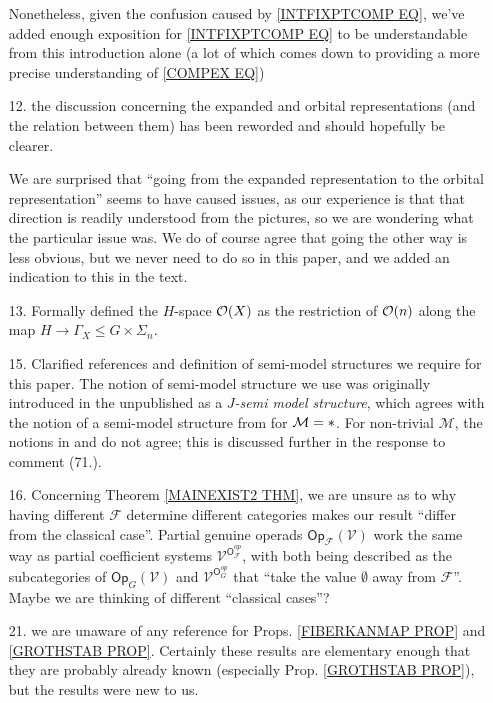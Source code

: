 \documentclass{article}
\begin{document}
\begin{itemize}
	Nonetheless, given the confusion caused by
	\eqref{INTFIXPTCOMP EQ},
	we've added enough exposition 
	for \eqref{INTFIXPTCOMP EQ} to be understandable from this introduction alone
	(a lot of which comes down
	to providing a more precise understanding of
	\eqref{COMPEX EQ})
	
	
	\item[12.] 
	the discussion concerning the expanded and orbital representations (and the relation between them) has been reworded and should hopefully be clearer.
	
	We are surprised that
	``going from the expanded representation to the orbital representation''
	seems to have caused issues, 
	as our experience is that that direction is 
	readily understood from the pictures,
	so we are wondering what the particular issue was.
	We do of course agree that going the other way is less obvious,
	but we never need to do so in this paper,
	and we added an indication to this in the text.
	


  \item[13.] Formally defined the $H$-space $\mathcal{O}(X)$ as the restriction of $\mathcal{O}(n)$ along the map $H \to \Gamma_X \leq G \times \Sigma_n$.
        
	\item[15.] Clarified references and definition of semi-model structures we require for this paper.
	The notion of semi-model structure we use was originally introduced in the unpublished \cite{Spi01} as a \textit{$J$-semi model structure},
	which agrees with the notion of a semi-model structure from \cite{WY18} for $\mathcal M = \**$.
	For non-trivial $\mathcal M$, the notions in \cite{Spi01} and \cite{WY18} do not agree;
	this is discussed further in the response to comment (71.).
	
	\item[16.] Concerning Theorem \ref{MAINEXIST2 THM},
	we are unsure as to why 
	having different $\mathcal{F}$ determine
	different categories makes our result
	``differ from the classical case''. 
	Partial genuine operads $\mathsf{Op}_{\mathcal{F}}(\mathcal{V})$
	work the same way as partial coefficient
	systems $\mathcal{V}^{\mathsf{O}_{\mathcal{F}}^{op}}$,
	with both being described as the subcategories
	of $\mathsf{Op}_{G}(\mathcal{V})$ and
	$\mathcal{V}^{\mathsf{O}_{G}^{op}}$
	that ``take the value $\emptyset$ away from $\mathcal{F}$''.
	Maybe we are thinking of different ``classical cases''? 
	
	\item[21.] we are unaware of any reference for Props. 
	\ref{FIBERKANMAP PROP} and \ref{GROTHSTAB PROP}.
	Certainly these results are elementary enough that they are probably already known (especially Prop. \ref{GROTHSTAB PROP}),
	but the results were new to us. 
	

\end{itemize}
\end{document}
